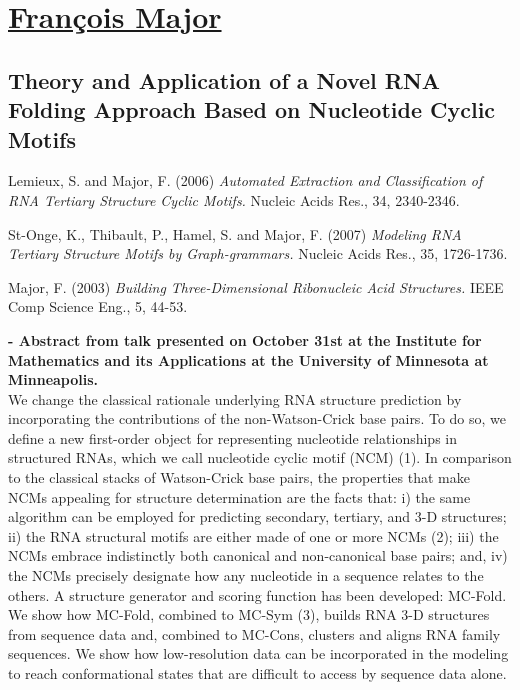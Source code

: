 \section*{\underline{Fran\c cois Major}}
\subsection*{Theory and Application of a Novel RNA Folding Approach Based on
Nucleotide Cyclic Motifs}

\begin{thebibliography}{1}
 Lemieux, S.  and Major, F.  (2006) {\em Automated Extraction and
Classification of RNA Tertiary  Structure Cyclic Motifs.} Nucleic Acids
Res., 34, 2340-2346.

 St-Onge,  K., Thibault, P., Hamel,  S. and Major,
  F. (2007) {\em Modeling
RNA Tertiary  Structure Motifs  by Graph-grammars.} Nucleic  Acids Res.,
35, 1726-1736.

 Major, F.  (2003) {\em Building Three-Dimensional Ribonucleic Acid
Structures.} IEEE Comp Science Eng., 5, 44-53.
\end{thebibliography}

\noindent
\textbf{ - Abstract from talk presented on October 31st at the Institute
  for Mathematics and its  Applications at the University of Minnesota
  at Minneapolis.}
\\

\noindent
We change the classical  rationale underlying RNA structure prediction
by  incorporating  the  contributions  of  the  non-Watson-Crick  base
pairs. To do  so, we define a new  first-order object for representing
nucleotide relationships in structured  RNAs, which we call nucleotide
cyclic  motif (NCM)  (1). In  comparison  to the  classical stacks  of
Watson-Crick base pairs, the properties that make NCMs
appealing for structure determination are  the facts that: i) the same
algorithm can be employed  for predicting secondary, tertiary, and 3-D
structures; ii)  the RNA structural motifs  are either made  of one or
more NCMs (2);  iii) the NCMs embrace indistinctly  both canonical and
non-canonical base pairs;  and, iv) the NCMs precisely
designate how  any nucleotide in a  sequence relates to  the others. A
structure   generator  and  scoring   function  has   been  developed:
MC-Fold. We show  how MC-Fold, combined to MC-Sym  (3), builds RNA 3-D
structures from  sequence data and, combined to  MC-Cons, clusters and
aligns RNA  family sequences. We  show how low-resolution data  can be
incorporated in  the modeling to reach conformational  states that are
difficult to access by sequence data alone.





